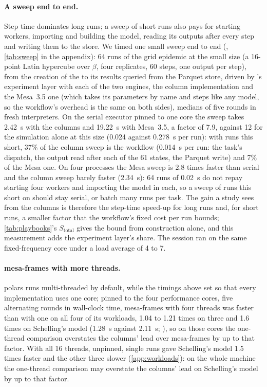 \paragraph{A sweep end to end.}
\label{sec:sweep}
Step time dominates long runs; a sweep of short runs also pays for starting workers,
importing and building the model, reading its outputs after every step and writing them
to the store. We timed one small sweep end to end (,
\cref{tab:sweep} in the appendix): 64 runs of the grid epidemic at the small size (a
16-point Latin hypercube over $\beta$, four replicates, 60 steps, one output per step), from
the creation of the  to its results queried from the Parquet store,
driven by \modelly{}'s experiment layer with each of the two engines, the column
implementation and the Mesa~3.5 one (which takes its parameters by name and steps like any
model, so the workflow's overhead is the same on both sides), medians of five rounds in
fresh interpreters. On the serial executor pinned to one core the sweep takes 2.42~s with
the columns and 19.22~s with Mesa~3.5, a factor of 7.9, against 12 for the simulation alone
at this size (0.024 against 0.278~s per run): with runs this short, 37\% of the column
sweep is the workflow (0.014~s per run: the task's dispatch, the output read after each of
the 61 states, the Parquet write) and 7\% of the Mesa one. On four processes the Mesa sweep is 2.8 times faster than serial and
the column sweep barely faster (2.34~s): 64 runs of 0.02~s do not repay starting four workers
and importing the model in each, so a sweep of runs this short on \modelly{} should stay
serial, or batch many runs per task. The gain a study sees from the columns is therefore
the step-time speed-up for long runs and, for short runs, a smaller factor that the
workflow's fixed cost per run bounds; \cref{tab:playbooks}'s $S_{\mathrm{total}}$ gives
the bound from construction alone, and this measurement adds the experiment layer's share.
The session ran on the same fixed-frequency core under a load average of 4 to 7.

\paragraph{mesa-frames with more threads.} polars runs multi-threaded by default, while the
timings above set  so that every implementation uses one core;
pinned to the four performance cores, five alternating rounds in wall-clock time, mesa-frames
with four threads was faster than with one on all four of its workloads, 1.04 to 1.21 times
on three and 1.6 times on Schelling's model (1.28~s against 2.11~s;
), so on those cores the one-thread comparison
overstates the columns' lead over mesa-frames by up to that factor. With all 16 threads, unpinned, single runs gave
Schelling's model 1.5 times faster and the other three slower (\cref{app:workloads}): on the
whole machine the one-thread comparison may overstate the columns' lead on Schelling's model
by up to that factor.

